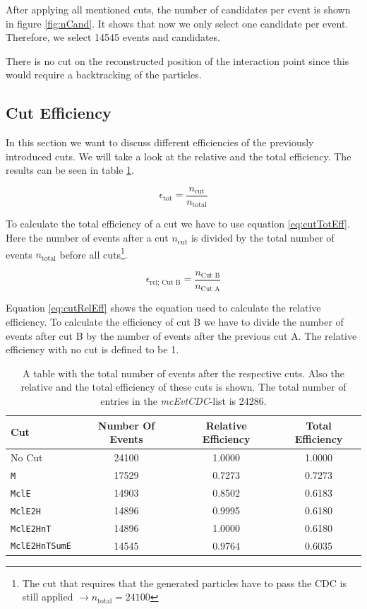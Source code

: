 \documentclass[a4paper,11pt,twosided,final,german,openbib,pdftex,listof=totoc,bibliography=totoc]{scrbook}
\begin{document}
After applying all mentioned cuts, the number of candidates per event is shown in figure \ref{fig:nCand}. It shows that now we only select one candidate per event. Therefore, we select 14545 events and candidates.

There is no cut on the reconstructed position of the interaction point since this would require a backtracking of the particles.




\subsection{Cut Efficiency}

In this section we want to discuss different efficiencies of the previously introduced cuts. We will take a look at the relative and the total efficiency. The results can be seen in table \ref{tab:cutEff}.

\begin{equation}
	\epsilon_{\textrm{tot}} = \frac{n_{\textrm{cut}}}{n_{\textrm{total}}}
	\label{eq:cutTotEff}
\end{equation}

To calculate the total efficiency of a cut we have to use equation \ref{eq:cutTotEff}. Here the number of events after a cut $n_{\textrm{cut}}$ is divided by the total number of events $n_{\textrm{total}}$ before all cuts\footnote{The cut that requires that the generated particles have to pass the CDC is still applied $\rightarrow n_{\textrm{total}} = 24100$}.

\begin{equation}
	\epsilon_{\textrm{rel; Cut B}} = \frac{n_{\textrm{Cut B}}}{n_{\textrm{Cut A}}}
	\label{eq:cutRelEff}
\end{equation}

Equation \ref{eq:cutRelEff} shows the equation used to calculate the relative efficiency. To calculate the efficiency of cut B we have to divide the number of events after cut B by the number of events after the previous
cut A. The relative efficiency with no cut is defined to be 1.

\begin{table}[h!]
	\centering
\begin{tabular}{lccc}
 Cut& Number Of Events&  Relative Efficiency& Total Efficiency\\
 \hline
 No Cut&24100 &1.0000 &1.0000 \\
 \texttt{M}& 17529&0.7273 &0.7273 \\
 \texttt{MclE}&14903 &0.8502 &0.6183 \\
 \texttt{MclE2H}&14896&0.9995  &0.6180 \\
 \texttt{MclE2HnT}&14896 &1.0000 &0.6180 \\
 \texttt{MclE2HnTSumE}& 14545 &0.9764 &0.6035 \\

\end{tabular}

\caption[Cut Efficiencies]{A table with the total number of events after the respective cuts. Also the relative and the total efficiency of these cuts is shown. The total number of entries in the \textit{mcEvtCDC}-list is 24286.}
\label{tab:cutEff}
\end{table}
\end{document}
